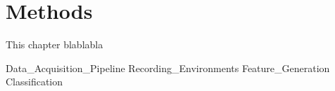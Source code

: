\chapter{Methods} \label{ch:methods}

This chapter blablabla

{Data_Acquisition_Pipeline}
{Recording_Environments}
{Feature_Generation}
{Classification}